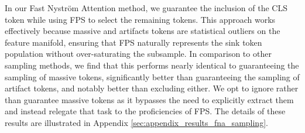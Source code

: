 
In our Fast Nystr\"om Attention method, we guarantee the inclusion of the CLS token while using FPS to select the remaining tokens. This approach works effectively because massive and artifacts tokens are statistical outliers on the feature manifold, ensuring that FPS naturally represents the sink token population without over-saturating the subsample. In comparison to other sampling methods, we find that this performs nearly identical to guaranteeing the sampling of massive tokens, significantly better than guaranteeing the sampling of artifact tokens, and notably better than excluding either. We opt to ignore rather than guarantee massive tokens as it bypasses the need to explicitly extract them and instead relegate that task to the proficiencies of FPS. The details of these results are illustrated in Appendix \ref{sec:appendix_results_fna_sampling}.



\begin{table}[H]
    \centering
    \footnotesize
    \vspace{-0.5em}
    \caption{Memory consumption and running time results on various sequence lengths. We report the average memory consumption and running time for one input batch (batch size = 8) through a standard self-attention module (from scratch) and our Fast Nystr\"om Attention (sample size = 64). }
    \label{tab:nfa_speed_and_mem}
\end{table}




